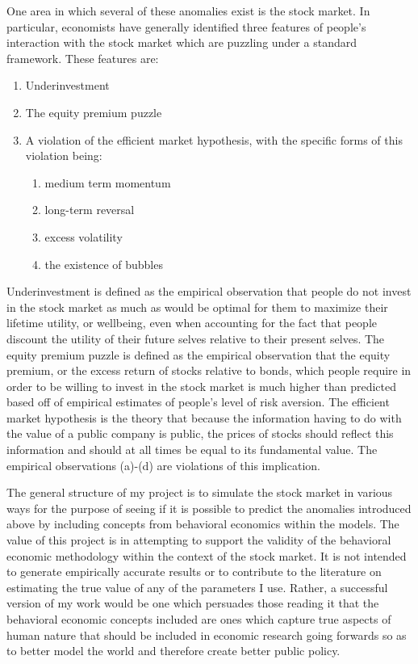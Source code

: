 \documentclass[10pt,twocolumn]{article}
\begin{document}
One area in which several of these anomalies exist is the stock market. In particular, economists have generally identified three features of people’s interaction with the stock market which are puzzling under a standard framework. These features are:
\begin{enumerate}
    \item Underinvestment
    \item The equity premium puzzle
    \item A violation of the efficient market hypothesis, with the specific forms of this violation being:
    \begin{enumerate}
        \item medium term momentum
        \item long-term reversal
        \item excess volatility
        \item the existence of bubbles
    \end{enumerate}
\end{enumerate}
Underinvestment is defined as the empirical observation that people do not invest in the stock market as much as would be optimal for them to maximize their lifetime utility, or wellbeing, even when accounting for the fact that people discount the utility of their future selves relative to their present selves. The equity premium puzzle is defined as the empirical observation that the equity premium, or the excess return of stocks relative to bonds, which people require in order to be willing to invest in the stock market is much higher than predicted based off of empirical estimates of people’s level of risk aversion. The efficient market hypothesis is the theory that because the information having to do with the value of a public company is public, the prices of stocks should reflect this information and should at all times be equal to its fundamental value. The empirical observations (a)-(d) are violations of this implication. 

The general structure of my project is to simulate the stock market in various ways for the purpose of seeing if it is possible to predict the anomalies introduced above by including concepts from behavioral economics within the models. The value of this project is in attempting to support the validity of the behavioral economic methodology within the context of the stock market. It is not intended to generate empirically accurate results or to contribute to the literature on estimating the true value of any of the parameters I use. Rather, a successful version of my work would be one which persuades those reading it that the behavioral economic concepts included are ones which capture true aspects of human nature that should be included in economic research going forwards so as to better model the world and therefore create better public policy. 
\end{document}
